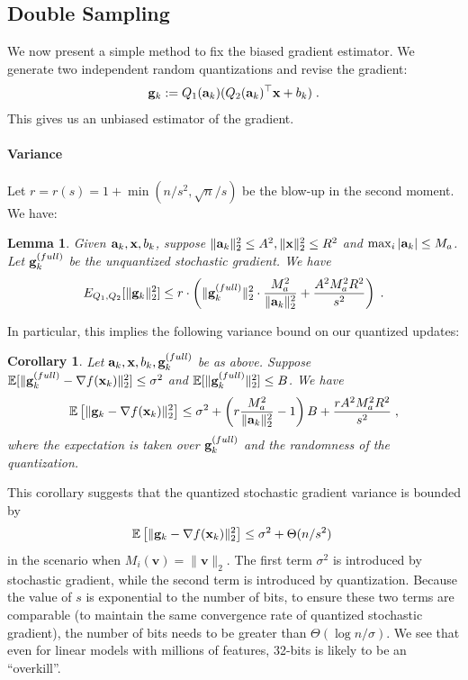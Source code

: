\documentclass{article}
\renewcommand{\vec}[1]{\mathbf{#1}}
\def\a{{\bf a}}
\def\g{{\bf g}}
\def\x{{\bf x}}
\def\E{\mathbb{E}}
\newtheorem{lemma}{Lemma}
\newtheorem{corollary}{Corollary}
\begin{document}
\subsection{Double Sampling}

We now present a simple method to fix the biased gradient estimator.
We generate two independent
random quantizations and revise the gradient:
\[
\g_k := Q_1 (\a_k) (Q_2 (\a_k)^\top \x + b_k) \; .
\]
This gives us an unbiased estimator 
of the gradient.

\paragraph{Variance}

Let $r = r(s) = 1 + \min (n / s^2, \sqrt{n}/ s)$ be the blow-up in the second moment.
We have:
\begin{lemma}
\label{lem:qbound}
    Given $\a_k, \x, b_k$, suppose $\| \a_k \|_2^2 \leq A^2, \| \x \|_2^2 \leq R^2$ and $\max_i |\a_k| \leq M_a$.
    Let $\g_k^{(full)}$ be the unquantized stochastic gradient. We have
    \[
    E_{Q_1, Q_2} [\| \g_k \|_2^2] \leq r \cdot \left( \| \g_k^{(full)} \|_2^2 \cdot \frac{M_a^2}{\| \a_k \|_2^2} + \frac{A^2 M_a^2 R^2}{s^2} \right)\; .
    \]
\end{lemma}

In particular, this implies the following variance bound on our quantized updates:
\begin{corollary}
    Let $\a_k, \x, b_k, \g_k^{(full)}$ be as above.
    Suppose $\E [\| \g_k^{(full)} - \nabla f(\x_k) \|_2^2 ] \leq \sigma^2$ and $\E [\| \g_k^{(full)} \|_2^2] \leq B$. We have
    \[
    \E \left[ \| \g_k - \nabla f(\x_k) \|_2^2 \right] \leq  \sigma^2 + \left(r \frac{M_a^2}{\| \a_k \|_2^2} - 1\right) B + \frac{r A^2 M_a^2 R^2}{s^2} \; ,
    \]
    where the expectation is taken over $\g_k^{(full)}$ and the randomness of the quantization.
\end{corollary}

This corollary suggests that the quantized stochastic gradient variance is bounded by
\[
\E \left[ \| \g_k - \nabla f(\x_k) \|_2^2 \right] \leq \sigma^2 + \Theta(n/s^2) \;
\]
in the scenario when $M_i (\vec{v}) = \| \vec{v} \|_2 $.
The first term $\sigma^2$ is introduced by stochastic gradient, while the second term is introduced by quantization. Because the value of $s$ is 
exponential to the number of bits, to ensure these two terms are comparable (to maintain the same convergence rate of quantized stochastic gradient), the number of bits needs to be greater than $\Theta(\log n / \sigma)$. We see that even for linear models with millions
of features, 32-bits is likely to be an ``overkill''.
\end{document}
